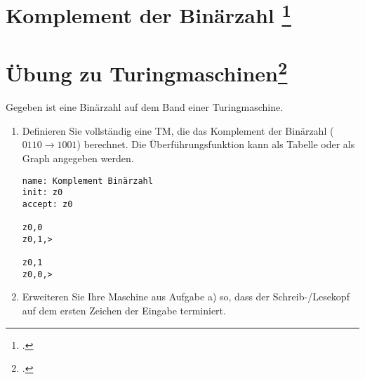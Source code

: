 \documentclass{bschlangaul-aufgabe}
\begin{document}
\section{Komplement der Binärzahl
\footcite[Seite 22]{theo:fs:3}}


\section{Übung zu Turingmaschinen\footcite{theo:fs:3}}

Gegeben ist eine Binärzahl auf dem Band einer Turingmaschine.

\begin{enumerate}
\item Definieren Sie vollständig eine TM, die das Komplement der
Binärzahl ($0110 \rightarrow 1001$) berechnet. Die Überführungsfunktion
kann als Tabelle oder als Graph angegeben werden.

\begin{liAntwort}
\begin{center}
\end{center}

\begin{verbatim}
name: Komplement Binärzahl
init: z0
accept: z0

z0,0
z0,1,>

z0,1
z0,0,>
\end{verbatim}
\end{liAntwort}

\item Erweiteren Sie Ihre Maschine aus Aufgabe a) so, dass der
Schreib-/Lesekopf auf dem ersten Zeichen der Eingabe terminiert.

\begin{liAntwort}
\begin{center}
\end{center}
\end{liAntwort}
\end{enumerate}
\end{document}

